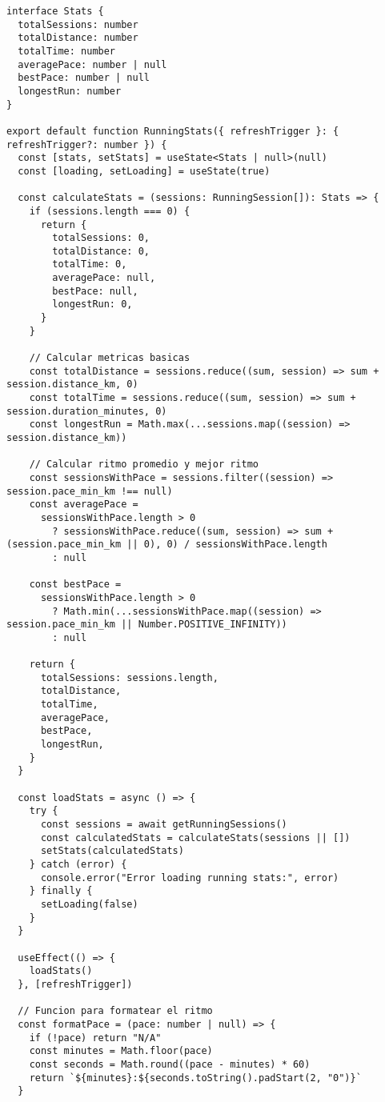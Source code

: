 \documentclass[12pt,a4paper]{article}
\begin{document}
\begin{lstlisting}[caption=components/running/running-stats.tsx - Logica de calculo]
interface Stats {
  totalSessions: number
  totalDistance: number
  totalTime: number
  averagePace: number | null
  bestPace: number | null
  longestRun: number
}

export default function RunningStats({ refreshTrigger }: { refreshTrigger?: number }) {
  const [stats, setStats] = useState<Stats | null>(null)
  const [loading, setLoading] = useState(true)

  const calculateStats = (sessions: RunningSession[]): Stats => {
    if (sessions.length === 0) {
      return {
        totalSessions: 0,
        totalDistance: 0,
        totalTime: 0,
        averagePace: null,
        bestPace: null,
        longestRun: 0,
      }
    }

    // Calcular metricas basicas
    const totalDistance = sessions.reduce((sum, session) => sum + session.distance_km, 0)
    const totalTime = sessions.reduce((sum, session) => sum + session.duration_minutes, 0)
    const longestRun = Math.max(...sessions.map((session) => session.distance_km))

    // Calcular ritmo promedio y mejor ritmo
    const sessionsWithPace = sessions.filter((session) => session.pace_min_km !== null)
    const averagePace =
      sessionsWithPace.length > 0
        ? sessionsWithPace.reduce((sum, session) => sum + (session.pace_min_km || 0), 0) / sessionsWithPace.length
        : null

    const bestPace =
      sessionsWithPace.length > 0
        ? Math.min(...sessionsWithPace.map((session) => session.pace_min_km || Number.POSITIVE_INFINITY))
        : null

    return {
      totalSessions: sessions.length,
      totalDistance,
      totalTime,
      averagePace,
      bestPace,
      longestRun,
    }
  }

  const loadStats = async () => {
    try {
      const sessions = await getRunningSessions()
      const calculatedStats = calculateStats(sessions || [])
      setStats(calculatedStats)
    } catch (error) {
      console.error("Error loading running stats:", error)
    } finally {
      setLoading(false)
    }
  }

  useEffect(() => {
    loadStats()
  }, [refreshTrigger])

  // Funcion para formatear el ritmo
  const formatPace = (pace: number | null) => {
    if (!pace) return "N/A"
    const minutes = Math.floor(pace)
    const seconds = Math.round((pace - minutes) * 60)
    return `${minutes}:${seconds.toString().padStart(2, "0")}`
  }


\end{lstlisting}
\end{document}
